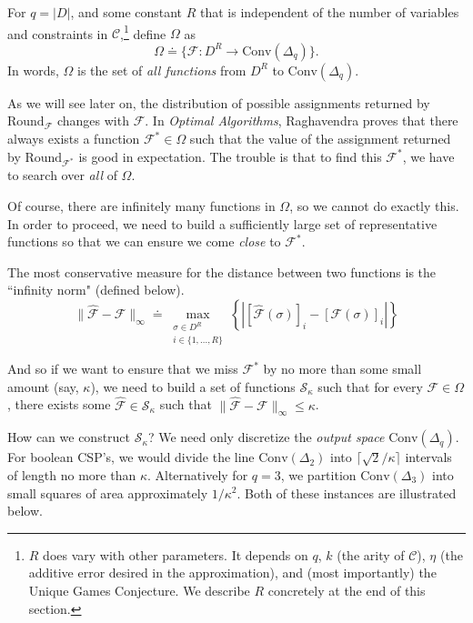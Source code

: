 For $q = |D|$, and some constant $R$ that is independent of the number of variables and constraints in $\mathcal{C}$,\footnote{$R$ does vary with other parameters. It depends on $q$, $k$ (the arity of $\mathcal{C}$), $\eta$ (the additive error desired in the approximation), and (most importantly) the Unique Games Conjecture. We describe $R$ concretely at the end of this section.}  define $\Omega$ as
\begin{equation}
\Omega \doteq \{ \mathcal{F} : D^R \to \text{Conv}(\Delta_q) \}.
\end{equation}
In words, $\Omega$ is the set of \textit{all functions} from $D^R$ to $\text{Conv}(\Delta_q)$.

As we will see later on, the distribution of possible assignments returned by $\text{Round}_{\mathcal{F}}$ changes with $\mathcal{F}$. In \textit{Optimal Algorithms}, Raghavendra proves that there always exists a function $\mathcal{F}^* \in \Omega$ such that the value of the assignment returned by $\text{Round}_{\mathcal{F}^*}$ is good in expectation. The trouble is that to find this $\mathcal{F}^*$, we have to search over \textit{all} of $\Omega$.

Of course, there are infinitely many functions in $\Omega$, so we cannot do exactly this. In order to proceed, we need to build a sufficiently large set of representative functions so that we can ensure we come \textit{close} to  $\mathcal{F}^*$.

The most conservative measure for the distance between two functions is the ``infinity norm" (defined below).
\begin{equation}
\| \hat{\mathcal{F}} - \mathcal{F} \|_{\infty} \doteq 
	\max_{\substack{\sigma \in D^R \\ i \in \{1,\ldots,R \}}} \left\{\left|\left[\hat{\mathcal{F}}(\sigma)\right]_i - \left[\mathcal{F}(\sigma)\right]_i\right|\right\}
\end{equation}

And so if we want to ensure that we miss $\mathcal{F}^*$ by no more than some small amount (say, $\kappa$), we need to build a set of functions $\mathcal{S}_\kappa$ such that for every $\mathcal{F} \in \Omega$, there exists some $\hat{\mathcal{F}} \in \mathcal{S}_\kappa$ such that $\| \hat{\mathcal{F}} - \mathcal{F} \|_{\infty} \leq \kappa $.

How can we construct $\mathcal{S}_\kappa$? We need only discretize the \textit{output space} $\text{Conv}(\Delta_q)$. For boolean CSP's, we would divide the line $\text{Conv}(\Delta_2)$ into $\lceil \sqrt{2}/\kappa \rceil$ intervals of length no more than $\kappa$. Alternatively for $ q = 3$, we partition $\text{Conv}(\Delta_3)$ into small squares of area approximately $1/\kappa^2$. Both of these instances are illustrated below.

